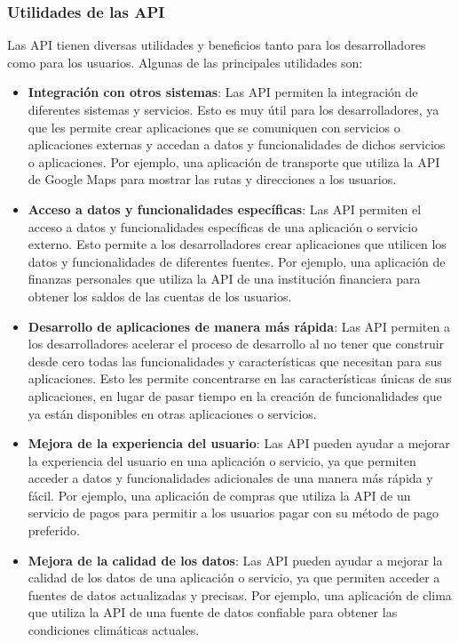 \documentclass[executivepaper]{article}
\begin{document}
\subsubsection{Utilidades de las API}

Las API tienen diversas utilidades y beneficios tanto para los desarrolladores como para los usuarios. Algunas de las principales utilidades son:

\begin{itemize}
\item \textbf{Integración con otros sistemas}: Las API permiten la integración de diferentes sistemas y servicios. Esto es muy útil para los desarrolladores, ya que les permite crear aplicaciones que se comuniquen con servicios o aplicaciones externas y accedan a datos y funcionalidades de dichos servicios o aplicaciones. Por ejemplo, una aplicación de transporte que utiliza la API de Google Maps para mostrar las rutas y direcciones a los usuarios.

\item \textbf{Acceso a datos y funcionalidades específicas}: Las API permiten el acceso a datos y funcionalidades específicas de una aplicación o servicio externo. Esto permite a los desarrolladores crear aplicaciones que utilicen los datos y funcionalidades de diferentes fuentes. Por ejemplo, una aplicación de finanzas personales que utiliza la API de una institución financiera para obtener los saldos de las cuentas de los usuarios.

\item \textbf{Desarrollo de aplicaciones de manera más rápida}: Las API permiten a los desarrolladores acelerar el proceso de desarrollo al no tener que construir desde cero todas las funcionalidades y características que necesitan para sus aplicaciones. Esto les permite concentrarse en las características únicas de sus aplicaciones, en lugar de pasar tiempo en la creación de funcionalidades que ya están disponibles en otras aplicaciones o servicios. 

\item \textbf{Mejora de la experiencia del usuario}: Las API pueden ayudar a mejorar la experiencia del usuario en una aplicación o servicio, ya que permiten acceder a datos y funcionalidades adicionales de una manera más rápida y fácil. Por ejemplo, una aplicación de compras que utiliza la API de un servicio de pagos para permitir a los usuarios pagar con su método de pago preferido.

\item \textbf{Mejora de la calidad de los datos}: Las API pueden ayudar a mejorar la calidad de los datos de una aplicación o servicio, ya que permiten acceder a fuentes de datos actualizadas y precisas. Por ejemplo, una aplicación de clima que utiliza la API de una fuente de datos confiable para obtener las condiciones climáticas actuales.


\end{itemize}
\end{document}
